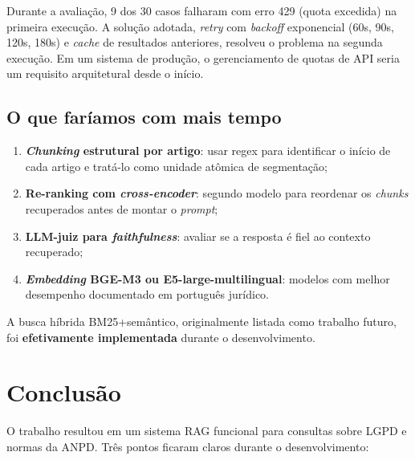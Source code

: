\documentclass[
  12pt,
  a4paper,
  brazil,
  article,
  oneside,
  sumario=tradicional
]{abntex2}
\begin{document}
Durante a avaliação, 9 dos 30 casos falharam com erro 429 (quota excedida) na
primeira execução. A solução adotada, \textit{retry} com \textit{backoff} exponencial
(60s, 90s, 120s, 180s) e \textit{cache} de resultados anteriores, resolveu o
problema na segunda execução. Em um sistema de produção, o gerenciamento de quotas de
API seria um requisito arquitetural desde o início.

\subsection{O que faríamos com mais tempo}

\begin{enumerate}[leftmargin=*]
  \item \textbf{\textit{Chunking} estrutural por artigo}: usar regex para identificar
        o início de cada artigo e tratá-lo como unidade atômica de segmentação;
  \item \textbf{Re-ranking com \textit{cross-encoder}}: segundo modelo para reordenar
        os \textit{chunks} recuperados antes de montar o \textit{prompt};
  \item \textbf{LLM-juiz para \textit{faithfulness}}: avaliar se a resposta é fiel ao
        contexto recuperado;
  \item \textbf{\textit{Embedding} BGE-M3 ou E5-large-multilingual}: modelos com
        melhor desempenho documentado em português jurídico.
\end{enumerate}

A busca híbrida BM25+semântico, originalmente listada como trabalho futuro, foi
\textbf{efetivamente implementada} durante o desenvolvimento.

\section{Conclusão}

O trabalho resultou em um sistema RAG funcional para consultas sobre LGPD e normas
da ANPD. Três pontos ficaram claros durante o desenvolvimento:
\end{document}
